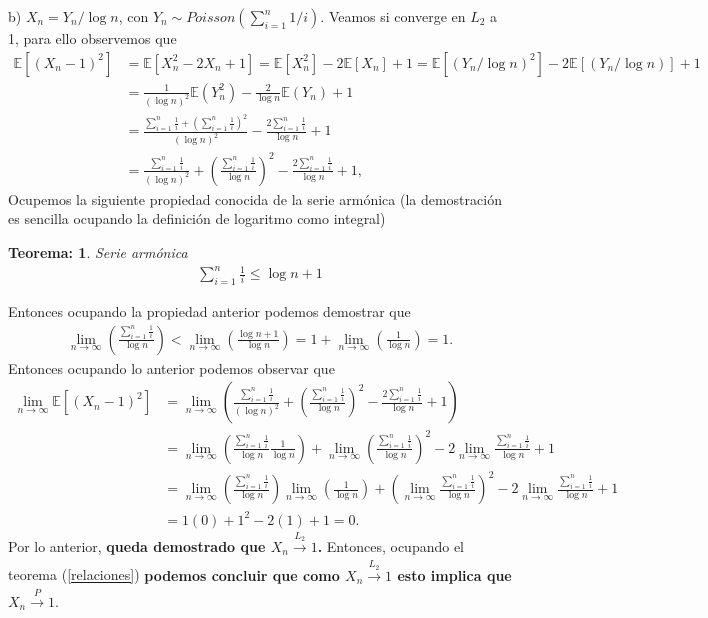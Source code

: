 \documentclass[11pt,letterpaper]{article}
\newcommand{\mE}{\mathbb{E}}
\newtheorem{thmt}{Teorema:}
\newcommand{\s}{\sum_{i=1}^n}
\begin{document}
b) $X_n=Y_n/\log n$, con $Y_n\sim Poisson\left(\sum_{i=1}^n 1/i \right).$ Veamos si converge en $L_2$ a 1, para ello observemos que 
\begin{align*}
\mE[\left( X_n-1\right)^2]&=\mE[X_n^2-2X_n+1]=\mE[X_n^2]-2\mE[X_n]+1= \mE[\left(Y_n/\log n\right)^2]-2\mE[\left(Y_n/\log n\right)]+1\\
&=\frac{1}{(\log n )^2}\mE(Y_n^2)-\frac{2}{\log n }\mE(Y_n)+1\\
&=\frac{\s \frac{1}{i}+ \left(\s \frac{1}{i} \right)^2}{(\log n)^2}-\frac{2\s \frac{1}{i}}{\log n}+1\\
&=\frac{\s \frac{1}{i}}{(\log n)^2}+ \left(\frac{\s \frac{1}{i}}{\log n}\right)^2-\frac{2\s \frac{1}{i}}{\log n}+1,
\end{align*}
Ocupemos la siguiente propiedad conocida de la serie armónica (la demostración es sencilla ocupando la definición de logaritmo como integral) 
\begin{framed}
    \begin{thmt} \label{limite}
    Serie armónica 
	\begin{align*}
	\sum_{i=1}^n \frac{1}{i} \leq \log n+1
	\end{align*}
    \end{thmt}
\end{framed}
Entonces ocupando la propiedad anterior podemos demostrar que
\begin{align*}
\lim_{n\rightarrow \infty} \left(\frac{\s \frac{1}{i}}{\log n}\right) < \lim_{n\rightarrow \infty} \left(\frac{\log n+1}{\log n}\right)=1+\lim_{n\rightarrow \infty} \left(\frac{1}{\log n}\right)=1.
\end{align*} 
Entonces ocupando lo anterior podemos observar que 
\begin{align*}
\lim_{n\rightarrow \infty} \mE[\left( X_n-1\right)^2]&=\lim_{n\rightarrow \infty}\left( \frac{\s \frac{1}{i}}{(\log n)^2}+ \left(\frac{\s \frac{1}{i}}{\log n}\right)^2-\frac{2\s \frac{1}{i}}{\log n}+1\right)\\
&=\lim_{n\rightarrow \infty} \left(\frac{\s \frac{1}{i}}{\log n} \frac{1}{\log n}\right)+\lim_{n\rightarrow \infty} \left(\frac{\s \frac{1}{i}}{\log n} \right)^2-2\lim_{n\rightarrow \infty} \frac{\s \frac{1}{i}}{\log n}+1\\
&=\lim_{n\rightarrow \infty} \left(\frac{\s \frac{1}{i}}{\log n}\right) \lim_{n\rightarrow \infty} \left(\frac{1}{\log n}\right)+\left(\lim_{n\rightarrow \infty} \frac{\s \frac{1}{i}}{\log n} \right)^2-2\lim_{n\rightarrow \infty} \frac{\s \frac{1}{i}}{\log n}+1\\
&=1(0)+1^2-2(1)+1=0.
\end{align*}
Por lo anterior, \textbf{queda demostrado que $X_n\xrightarrow[]{L_2} 1$.} Entonces, ocupando el teorema (\ref{relaciones}) \textbf{podemos concluir que como $X_n\xrightarrow[]{L_2} 1$ esto  implica que $X_n\xrightarrow[]{P} 1.$}
\end{document}

